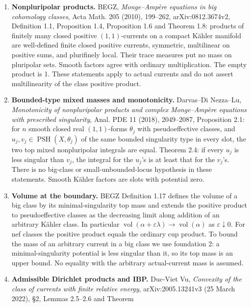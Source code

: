\documentclass[
  11pt,
]{article}
\providecommand{\tightlist}{%
  \setlength{\itemsep}{0pt}\setlength{\parskip}{0pt}}
\begin{document}
\begin{enumerate}
\def\labelenumi{\arabic{enumi}.}
\tightlist
\item
  \textbf{Nonpluripolar products.} BEGZ, \emph{Monge--Ampère equations
  in big cohomology classes}, Acta Math. 205 (2010), 199--262,
  arXiv:0812.3674v2, Definition 1.1, Proposition 1.4, Proposition 1.6
  and Theorem 1.8: products of finitely many closed positive
  \((1,1)\)-currents on a compact Kähler manifold are well-defined
  finite closed positive currents, symmetric, multilinear on positive
  sums, and plurifinely local. Their trace measures put no mass on
  pluripolar sets. Smooth factors agree with ordinary multiplication.
  The empty product is 1. These statements apply to actual currents and
  do not assert multilinearity of the class positive product.
\item
  \textbf{Bounded-type mixed masses and monotonicity.} Darvas--Di
  Nezza--Lu, \emph{Monotonicity of nonpluripolar products and complex
  Monge--Ampère equations with prescribed singularity}, Anal. PDE 11
  (2018), 2049--2087, Proposition 2.1: for \(n\) smooth closed real
  \((1,1)\)-forms \(\theta_j\) with pseudoeffective classes, and
  \(u_j,v_j\in\operatorname{PSH}(X,\theta_j)\) of the same bounded
  singularity type in every slot, the two top mixed nonpluripolar
  integrals are equal. Theorem 2.4: if every \(u_j\) is less singular
  than \(v_j\), the integral for the \(u_j\)'s is at least that for the
  \(v_j\)'s. There is no big-class or small-unbounded-locus hypothesis
  in these statements. Smooth Kähler factors are slots with potential
  zero.
\item
  \textbf{Volume at the boundary.} BEGZ Definition 1.17 defines the
  volume of a big class by its minimal-singularity top mass and extends
  the positive product to pseudoeffective classes as the decreasing
  limit along addition of an arbitrary Kähler class. In particular
  \(\operatorname{vol}(\alpha+\varepsilon\lambda)\to\operatorname{vol}(\alpha)\)
  as \(\varepsilon\downarrow0\). For nef classes the positive product
  equals the ordinary cup product. To bound the mass of an arbitrary
  current in a big class we use foundation 2: a minimal-singularity
  potential is less singular than it, so its top mass is an upper bound.
  No equality with the arbitrary actual-current mass is assumed.
\item
  \textbf{Admissible Dirichlet products and IBP.} Duc-Viet Vu,
  \emph{Convexity of the class of currents with finite relative energy},
  arXiv:2005.13241v3 (25 March 2022), §2, Lemmas 2.5--2.6 and Theorem

\end{enumerate}
\end{document}
